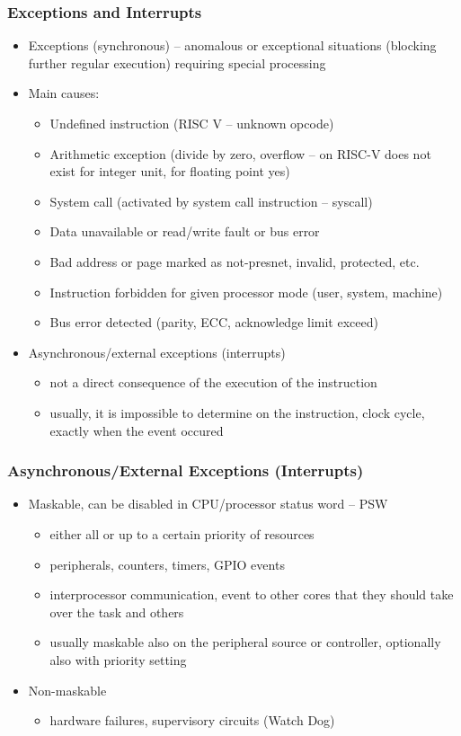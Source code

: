 \documentclass{beamer}
\begin{document}
\begin{frame}
\frametitle{Exceptions and Interrupts}

\begin{itemize}
 \item Exceptions (synchronous) -- anomalous or exceptional situations (blocking
further regular execution) requiring special processing
 \item Main causes:
 \begin{itemize}
  \item Undefined instruction (RISC V -- unknown opcode)
  \item Arithmetic exception (divide by zero, overflow -- on RISC-V does not exist for integer unit, for floating point yes)
  \item System call (activated by system call instruction -- syscall)
  \item Data unavailable or read/write fault or bus error
  \item Bad address or page marked as not-presnet, invalid, protected, etc.
  \item Instruction forbidden for given processor mode (user, system, machine)
  \item Bus error detected (parity, ECC, acknowledge limit exceed)
 \end{itemize}
 \item Asynchronous/external exceptions (interrupts)
 \begin{itemize}
  \item not a direct consequence of the execution of the instruction
  \item usually, it is impossible to determine on the instruction, clock cycle, exactly when the event occured
 \end{itemize}
\end{itemize}
\end{frame}

\begin{frame}
\frametitle{Asynchronous/External Exceptions (Interrupts)}

\begin{itemize}
 \item Maskable, can be disabled in CPU/processor status word -- PSW
 \begin{itemize}
   \item either all or up to a certain priority of resources
   \item peripherals, counters, timers, GPIO events
   \item interprocessor communication, event to other cores that they should take over the task and others
   \item usually maskable also on the peripheral source or controller, optionally also with priority setting
 \end{itemize}
 \item Non-maskable
 \begin{itemize}
  \item hardware failures, supervisory circuits (Watch Dog)
 \end{itemize}
\end{itemize}
\end{frame}
\end{document}
